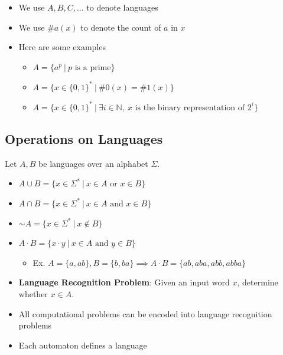 \documentclass{report}
\begin{document}
\begin{itemize}[leftmargin=0.2in]
  \item We use $A,B,C,...$ to denote languages
  \item We use $\#a(x)$ to denote the count of $a$ in $x$
\end{itemize}

\begin{itemize}[leftmargin=0.2in]
  \item Here are some examples
        \begin{itemize}[leftmargin=0.2in]
          \item $A = \{ a^p \ | \ p \text{ is a prime} \}$
          \item $A = \{ x \in \{0,1\}^* \ | \ \#0(x) = \#1(x) \}$
          \item $A = \{ x \in \{0,1\}^* \ | \ \exists i \in \mathbb{N}, \ x\text{ is the binary representation of } 2^i \}$
        \end{itemize}
\end{itemize}

\subsection{Operations on Languages}

Let $A,B$ be languages over an alphabet $\Sigma$.
\begin{itemize}[leftmargin=0.2in]
  \item $A \cup B = \{ x \in \Sigma^* \ | \ x \in A \text{ or } x \in B \}$
  \item $A \cap B = \{ x \in \Sigma^* \ | \ x \in A \text{ and } x \in B \}$
  \item $\sim A = \{ x \in \Sigma^* \ | \ x \notin B \}$
  \item $A \cdot B = \{ x \cdot y \ | \ x \in A \text{ and } y \in B \}$
        \begin{itemize}[leftmargin=0.2in]
          \item Ex. $A = \{a,ab\}, B = \{b,ba\} \implies A \cdot B = \{ ab,aba,abb,abba \}$
        \end{itemize}
\end{itemize}

\begin{itemize}[leftmargin=0.2in]
  \item \textbf{Language Recognition Problem}: Given an input word $x$, determine whether $x \in A$.
  \item All computational problems can be encoded into language recognition problems
  \item Each automaton defines a language
\end{itemize}
\end{document}
